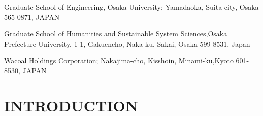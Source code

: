 \documentclass[E]{scitrans}
\begin{document}
\address{**}{Graduate School of Engineering,
	Osaka University;
	Yamadaoka, Suita city, Osaka 565-0871, JAPAN}
\address{***}{Graduate School of Humanities and Sustainable System Sciences,Osaka Prefecture University, 1-1, Gakuencho, Naka-ku, Sakai, Osaka 599-8531, Japan}
\address{****}{Wacoal Holdings Corporation;
	Nakajima-cho, Kisshoin, Minami-ku,Kyoto 601-8530, JAPAN}


%

\section*{INTRODUCTION}
\end{document}
